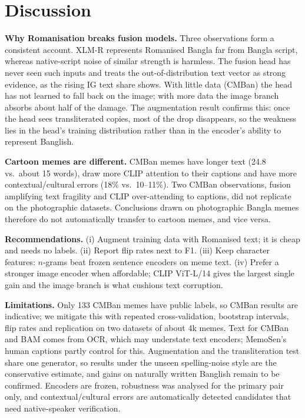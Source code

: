 \section{Discussion}
\label{sec:discussion}

\textbf{Why Romanisation breaks fusion models.} Three observations form a consistent account. XLM-R represents
Romanised Bangla far from Bangla script, whereas native-script noise of similar strength is harmless. The fusion head
has never seen such inputs and treats the out-of-distribution text vector as strong evidence, as the rising IG text
share shows. With little data (CMBan) the head has not learned to fall back on the image; with more data the image
branch absorbs about half of the damage. The augmentation result confirms this: once the head sees transliterated
copies, most of the drop disappears, so the weakness lies in the head's training distribution rather than in the
encoder's ability to represent Banglish.

\textbf{Cartoon memes are different.} CMBan memes have longer text (24.8 vs.\ about 15 words), draw more CLIP
attention to their captions and have more contextual/cultural errors (18\% vs.\ 10--11\%). Two CMBan observations,
fusion amplifying text fragility and CLIP over-attending to captions, did not replicate on the photographic datasets.
Conclusions drawn on photographic Bangla memes therefore do not automatically transfer to cartoon memes, and vice
versa.

\textbf{Recommendations.} (i) Augment training data with Romanised text; it is cheap and needs no labels. (ii) Report
flip rates next to F1. (iii) Keep character features: $n$-grams beat frozen sentence encoders on meme text.
(iv) Prefer a stronger image encoder when affordable; CLIP ViT-L/14 gives the largest single gain and the image branch
is what cushions text corruption.

\textbf{Limitations.} Only 133 CMBan memes have public labels, so CMBan results are indicative; we mitigate this with
repeated cross-validation, bootstrap intervals, flip rates and replication on two datasets of about 4k memes. Text for
CMBan and BAM comes from OCR, which may understate text encoders; MemoSen's human captions partly control for this.
Augmentation and the transliteration test share one generator, so results under the unseen spelling-noise style are
the conservative estimate, and gains on naturally written Banglish remain to be confirmed. Encoders are frozen,
robustness was analysed for the primary pair only, and contextual/cultural errors are automatically detected
candidates that need native-speaker verification.

